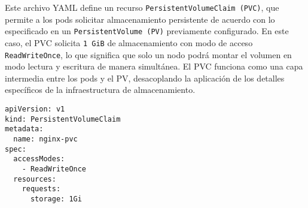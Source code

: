 Este archivo YAML define un recurso \texttt{PersistentVolumeClaim (PVC)}, que permite a los pods solicitar almacenamiento persistente de acuerdo con lo especificado en un \texttt{PersistentVolume (PV)} previamente configurado. En este caso, el PVC solicita \texttt{1~GiB} de almacenamiento con modo de acceso \texttt{ReadWriteOnce}, lo que significa que solo un nodo podrá montar el volumen en modo lectura y escritura de manera simultánea. El PVC funciona como una capa intermedia entre los pods y el PV, desacoplando la aplicación de los detalles específicos de la infraestructura de almacenamiento.

\begin{verbatim}
apiVersion: v1
kind: PersistentVolumeClaim
metadata:
  name: nginx-pvc
spec:
  accessModes:
    - ReadWriteOnce
  resources:
    requests:
      storage: 1Gi
\end{verbatim}